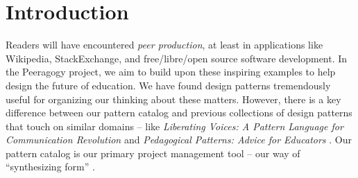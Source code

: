 
\section{Introduction}\label{sec:Introduction}

Readers will have encountered \emph{peer production}, at least in applications like Wikipedia, StackExchange, and free/libre/open source software development.   In the Peeragogy project,  we aim to build upon these inspiring examples to help design the future of education.  
We have found design patterns tremendously useful for organizing our thinking about these matters.  However, there is a key difference between our pattern catalog and previous collections of design patterns that touch on similar domains -- like \emph{Liberating Voices: A Pattern Language for Communication Revolution} \cite{schuler2008liberating} and \emph{Pedagogical Patterns: Advice for Educators} \cite{bergin2012pedagogical}.  Our pattern catalog is our primary project management tool -- our way of ``synthesizing form'' \cite{alexander1964notes}.

